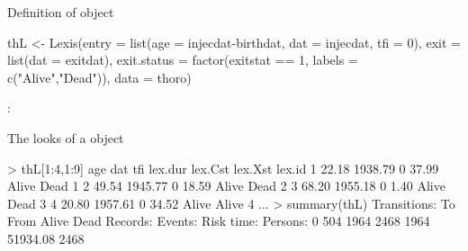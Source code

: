 \begin{frame}[fragile]{Definition of  object}
 \small
 \vspace*{-1em}
\renewcommand{\baselinestretch}{0.9}
\begin{semiverbatim}
thL <- Lexis(\alert<2>{entry = list(age = injecdat-birthdat,
                          \alert<5->{dat = injecdat},
                          tfi = 0)},
              \alert<3>{exit = list(\alert<5->{dat = exitdat})},
       exit.status = factor(exitstat == 1,
                            labels = c("Alive","Dead")),
              data = thoro)
\end{semiverbatim}
\renewcommand{\baselinestretch}{1.0}
\normalsize
{} : 

\end{frame}

\begin{frame}[fragile]{The looks of a  object}
\small
\renewcommand{\baselinestretch}{0.9}
\begin{semiverbatim}
> thL[1:4,1:9]
    age     dat tfi \alert<3>{lex.dur} \alert<5>{lex.Cst} \alert<4>{lex.Xst} lex.id
1 22.18 1938.79   0 \alert<3>{  37.99} \alert<5>{  Alive} \alert<4>{   Dead}      1
2 49.54 1945.77   0 \alert<3>{  18.59} \alert<5>{  Alive} \alert<4>{   Dead}      2
3 68.20 1955.18   0 \alert<3>{   1.40} \alert<5>{  Alive} \alert<4>{   Dead}      3
4 20.80 1957.61   0 \alert<3>{  34.52} \alert<5>{  Alive} \alert<4>{  Alive}      4
...
\pause
> summary(thL)
Transitions:
     \alert<4>{To}
\alert<5>{From} \alert<4>{Alive Dead} Records:  \alert<4>{Events:}  \alert<3>{Risk time:}  Persons:
\alert<5>{   0} \alert<4>{  504 1964}     2468  \alert<4>{   1964}  \alert<3>{  51934.08}      2468
\end{semiverbatim}
\renewcommand{\baselinestretch}{1.0}
\end{frame}

